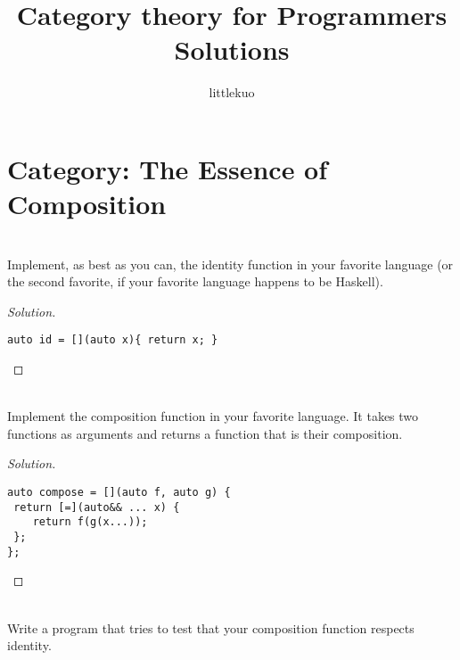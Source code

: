 \documentclass[7x10,thmnumcontwithchapter,WebLink,AddlevelTwoTOC,NumRef,BookEndNote,printer]{pupbook}
\begin{document}
\frontmatter






\title{Category theory for Programmers\\ Solutions}



\author{littlekuo}



\makepuptitle

\cleardoublepage


\tableofcontents

\cleardoublepage

\mainmatter


\chapter[Category: The Essence of Composition]{Category: The Essence of Composition\thefootnote}


\begin{exercise}
~\\
Implement, as best as you can, the identity function in your favorite
language (or the second favorite, if your favorite language
happens to be Haskell).
\end{exercise}

\begin{proof}[Solution]
~\\
\begin{lstlisting}
auto id = [](auto x){ return x; }
\end{lstlisting}
\end{proof}


\begin{exercise}
	~\\
Implement the composition function in your favorite language. It
takes two functions as arguments and returns a function that is
their composition.
\end{exercise}

\begin{proof}[Solution]
	~\\
\begin{lstlisting}
auto compose = [](auto f, auto g) { 
 return [=](auto&& ... x) { 
    return f(g(x...)); 
 }; 
};
\end{lstlisting}
\end{proof}


\begin{exercise}
	~\\
Write a program that tries to test that your composition function
respects identity.
\end{exercise}
\end{document}
